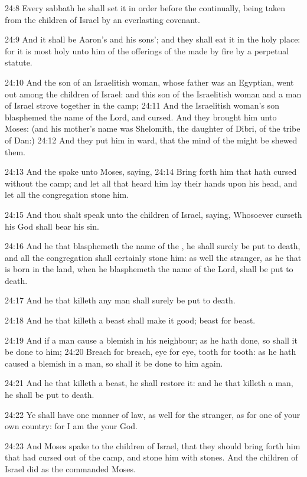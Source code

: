 24:8 Every sabbath he shall set it in order before the \LORD continually, being taken from the children of Israel by an everlasting covenant.

24:9 And it shall be Aaron's and his sons'; and they shall eat it in the holy place: for it is most holy unto him of the offerings of the \LORD made by fire by a perpetual statute.

24:10 And the son of an Israelitish woman, whose father was an Egyptian, went out among the children of Israel: and this son of the Israelitish woman and a man of Israel strove together in the camp; 24:11 And the Israelitish woman's son blasphemed the name of the Lord, and cursed. And they brought him unto Moses: (and his mother's name was Shelomith, the daughter of Dibri, of the tribe of Dan:) 24:12 And they put him in ward, that the mind of the \LORD might be shewed them.

24:13 And the \LORD spake unto Moses, saying, 24:14 Bring forth him that hath cursed without the camp; and let all that heard him lay their hands upon his head, and let all the congregation stone him.

24:15 And thou shalt speak unto the children of Israel, saying, Whosoever curseth his God shall bear his sin.

24:16 And he that blasphemeth the name of the \LORD, he shall surely be put to death, and all the congregation shall certainly stone him: as well the stranger, as he that is born in the land, when he blasphemeth the name of the Lord, shall be put to death.

24:17 And he that killeth any man shall surely be put to death.

24:18 And he that killeth a beast shall make it good; beast for beast.

24:19 And if a man cause a blemish in his neighbour; as he hath done, so shall it be done to him; 24:20 Breach for breach, eye for eye, tooth for tooth: as he hath caused a blemish in a man, so shall it be done to him again.

24:21 And he that killeth a beast, he shall restore it: and he that killeth a man, he shall be put to death.

24:22 Ye shall have one manner of law, as well for the stranger, as for one of your own country: for I am the \LORD your God.

24:23 And Moses spake to the children of Israel, that they should bring forth him that had cursed out of the camp, and stone him with stones. And the children of Israel did as the \LORD commanded Moses.


